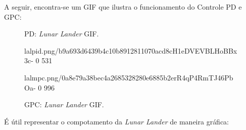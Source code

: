 \documentclass[12pt,           %
a4paper,                       %
openany,                       %
oneside,                       %
chapter=TITLE,                 %
english,                       %
spanish,                       %
brazil,                        %
sumario=tradicional]{abntex2}  %
\begin{document}
\begin{OnehalfSpace}
A seguir, encontra-se um GIF que ilustra o funcionamento do Controle PD e GPC:

\begin{figure}[H]
  \begin{minipage}{0.5\textwidth}
    \centering
    \caption{PD: \textit{Lunar Lander} GIF.}
    {lalpid.png/b9a693d6439b4c10b8912811070acd8cH1eDVEVBLHoBBx3c-}%
    {0}%
    {531}%
    \label{fig:pct}
  \end{minipage}
  \begin{minipage}{0.5\textwidth}
    \centering
    \caption{GPC: \textit{Lunar Lander} GIF.}
    {lalmpc.png/0a8e79a38bec4a2685328280e6885b2erR4qP4RmTJ46PbOa-}%
    {0}%
    {996}%
    \label{fig:gct}
  \end{minipage}
\end{figure}
\vspace*{-.7cm}
{\raggedright {}}

É útil representar o compotamento da \textit{Lunar Lander} de maneira gráfica:


\end{OnehalfSpace}
\end{document}
